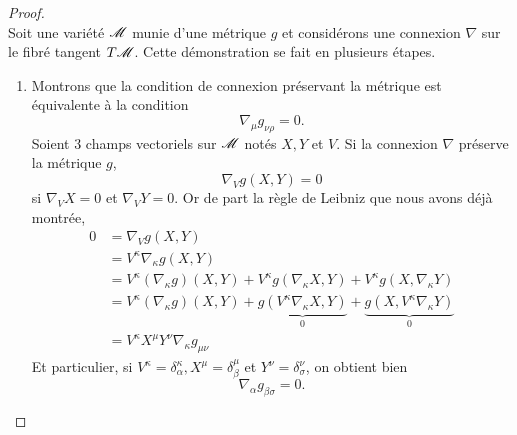 \documentclass[a4paper,11pt]{report}
\begin{document}
                \begin{proof}${}$\\
                    Soit une variété $\mathscr{M}$ munie d'une métrique $g$ et considérons une connexion $\nabla$ sur le fibré tangent $T\mathscr{M}$.
                    Cette démonstration se fait en plusieurs étapes.
                    \begin{enumerate}[label = \textit{\roman*)}]
                            \item Montrons que la condition de connexion préservant la            métrique est équivalente à la condition
                                \begin{equation}
                                    \nabla_\mu g_{\nu\rho} = 0.
                                \end{equation}
                                Soient $3$ champs vectoriels sur $\mathscr{M}$ notés $X,Y$ et $V$. Si la connexion $\nabla$ préserve la métrique $g$, 
                                \begin{equation}
                                    \nabla_Vg(X,Y) = 0
                                \end{equation}
                                si $\nabla_V X = 0$ et $\nabla_V Y = 0$. Or de part la règle de Leibniz que nous avons déjà montrée,
                                \begin{align}
                                    0 &= \nabla_Vg(X,Y) \\
                                    &= V^\kappa \nabla_\kappa g(X,Y)\\
                                    &= V^\kappa(\nabla_\kappa g)(X,Y) + V^\kappa g( \nabla_\kappa X,Y) + V^\kappa g(X, \nabla_\kappa Y)\\
                                    &= V^\kappa(\nabla_\kappa g)(X,Y) + \underbrace{g(V^\kappa \nabla_\kappa X,Y)}_{0} +  \underbrace{g(X, V^\kappa\nabla_\kappa Y)}_{0}\\
                                    &= V^\kappa X^\mu Y^\nu \nabla_\kappa g_{\mu\nu}
                                \end{align}
                                Et particulier, si $V^\kappa = \delta^\kappa_\alpha,X^\mu = \delta^\mu_\beta$ et $Y^\nu = \delta^\nu_\sigma$, on obtient bien
                                \begin{equation}
                                    \nabla_\alpha g_{\beta\sigma} = 0.
                                \end{equation}
                                

\end{enumerate}
\end{proof}
\end{document}
